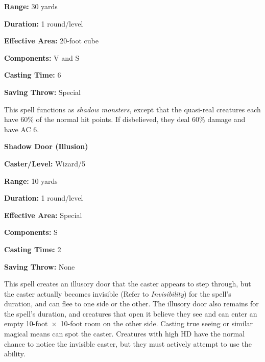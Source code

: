 \begin{multicols}{2}
\begin{minipage}{\columnwidth}
\noindent \textbf{Range:} 30 yards

\noindent \textbf{Duration:} 1 round/level

\noindent \textbf{Effective Area:} 20-foot cube

\noindent \textbf{Components:} V and S

\noindent \textbf{Casting Time:} 6

\noindent \textbf{Saving Throw:} Special

\end{minipage}

This spell functions as \textit{shadow monsters}, except that the quasi-real creatures each have 60\% of the normal hit points.  If disbelieved, they deal 60\% damage and have AC 6.  

\vspace{1em}

\noindent
\begin{minipage}{\columnwidth}

\noindent \textbf{Shadow Door (Illusion)}

\noindent \textbf{Caster/Level:} Wizard/5

\noindent \textbf{Range:} 10 yards

\noindent \textbf{Duration:} 1 round/level

\noindent \textbf{Effective Area:} Special

\noindent \textbf{Components:} S

\noindent \textbf{Casting Time:} 2

\noindent \textbf{Saving Throw:} None

\end{minipage}

This spell creates an illusory door that the caster appears to step through, but the caster actually becomes invisible (Refer to \textit{Invisibility}) for the spell's duration, and can flee to one side or the other.  The illusory door also remains for the spell's duration, and creatures that open it believe they see and can enter an empty 10-foot~$\times$~10-foot room on the other side.  Casting true seeing or similar magical means can spot the caster.  Creatures with high HD have the normal chance to notice the invisible caster, but they must actively attempt to use the ability. 

\vspace{1em}

\noindent
\begin{minipage}{\columnwidth}


\end{minipage}
\end{multicols}
